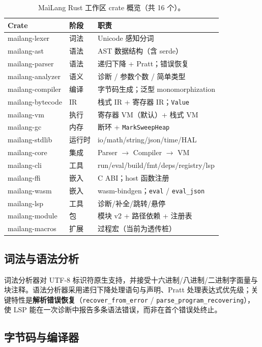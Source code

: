 \documentclass[10pt,a4paper]{article}
\begin{document}
\begin{table}[t]
\centering
\caption{MaìLang Rust 工作区 crate 概览（共 16 个）。}
\label{tab:crates}
\small
\begin{tabular}{@{}llp{6.8cm}@{}}
\toprule
\textbf{Crate} & \textbf{阶段} & \textbf{职责} \\
\midrule
mailang-lexer & 词法 & Unicode 感知分词 \\
mailang-ast & 语法 & AST 数据结构（含 serde） \\
mailang-parser & 语法 & 递归下降 + Pratt；错误恢复 \\
mailang-analyzer & 语义 & 诊断 / 参数个数 / 简单类型 \\
mailang-compiler & 编译 & 字节码生成；泛型 monomorphization \\
mailang-bytecode & IR & 栈式 IR + 寄存器 IR；\texttt{Value} \\
mailang-vm & 执行 & 寄存器 VM（默认）+ 栈式 VM \\
mailang-gc & 内存 & 断环 + \texttt{MarkSweepHeap} \\
mailang-stdlib & 运行时 & io/math/string/json/time/HAL \\
mailang-core & 集成 & Parser $\rightarrow$ Compiler $\rightarrow$ VM \\
mailang-cli & 工具 & run/eval/build/fmt/deps/registry/lsp \\
mailang-ffi & 嵌入 & C ABI；host 函数注册 \\
mailang-wasm & 嵌入 & wasm-bindgen；\texttt{eval} / \texttt{eval\_json} \\
mailang-lsp & 工具 & 诊断/补全/跳转/悬停 \\
mailang-module & 包 & 模块 v2 + 路径依赖 + 注册表 \\
mailang-macros & 扩展 & 过程宏（当前为透传桩） \\
\bottomrule
\end{tabular}
\end{table}

\subsection{词法与语法分析}

词法分析器对 UTF-8 标识符原生支持，并接受十六进制/八进制/二进制字面量与块注释。语法分析器采用递归下降处理语句与声明、Pratt 处理表达式优先级；关键特性是\textbf{解析错误恢复}（\texttt{recover\_from\_error} / \texttt{parse\_program\_recovering}），使 LSP 能在一次诊断中报告多条语法错误，而非在首个错误处终止。

\subsection{字节码与编译器}
\end{document}

